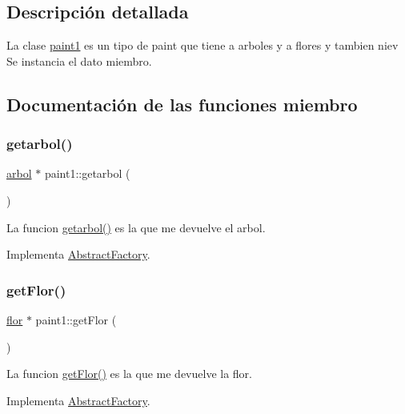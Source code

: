 \subsection{Descripción detallada}
La clase \hyperlink{classpaint1}{paint1} es un tipo de paint que tiene a arboles y a flores y tambien niev  Se instancia el dato miembro. 

\subsection{Documentación de las funciones miembro}
\mbox{\label{classpaint1_a249b589508df7acb5e763abd1cae42c2}} 
\subsubsection{\texorpdfstring{getarbol()}{getarbol()}}
{\footnotesize\ttfamily \hyperlink{classarbol}{arbol} $\ast$ paint1\+::getarbol (\begin{DoxyParamCaption}{ }\end{DoxyParamCaption})\hspace{0.3cm}{\ttfamily [virtual]}}

La funcion \hyperlink{classpaint1_a249b589508df7acb5e763abd1cae42c2}{getarbol()} es la que me devuelve el arbol. 

Implementa \hyperlink{classAbstractFactory}{Abstract\+Factory}.

\mbox{\label{classpaint1_ae5bf28220e7c9b9f8ce361de3feb5f39}} 
\subsubsection{\texorpdfstring{get\+Flor()}{getFlor()}}
{\footnotesize\ttfamily \hyperlink{classflor}{flor} $\ast$ paint1\+::get\+Flor (\begin{DoxyParamCaption}{ }\end{DoxyParamCaption})\hspace{0.3cm}{\ttfamily [virtual]}}

La funcion \hyperlink{classpaint1_ae5bf28220e7c9b9f8ce361de3feb5f39}{get\+Flor()} es la que me devuelve la flor. 

Implementa \hyperlink{classAbstractFactory}{Abstract\+Factory}.

